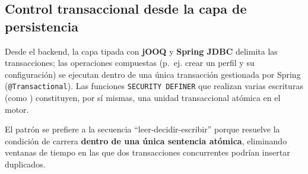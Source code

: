 \subsection{Control transaccional desde la capa de persistencia}
\label{subsec:control_tx}

Desde el backend, la capa tipada con \textbf{jOOQ} y \textbf{Spring JDBC} delimita las
transacciones; las operaciones compuestas (p.~ej. crear un perfil y su configuración)
se ejecutan dentro de una única transacción gestionada por Spring
(\texttt{@Transactional}). Las funciones \texttt{SECURITY DEFINER} que realizan varias
escrituras (como ) constituyen, por sí mismas, una
unidad transaccional atómica en el motor.

\begin{NotaTecnica}
El patrón  se prefiere a la secuencia
``leer-decidir-escribir'' porque resuelve la condición de carrera \textbf{dentro de una
única sentencia atómica}, eliminando ventanas de tiempo en las que dos transacciones
concurrentes podrían insertar duplicados.
\end{NotaTecnica}
